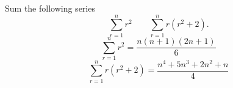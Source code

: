 Sum the following series
\[
\sum^n_{r=1} r^2 \quad \quad \sum^n_{r=1} r(r^2+2).
\]
\newline
\[
\sum^n_{r=1} r^2 = \frac{n(n+1)(2n+1)}{6}
\]
\[
\sum^n_{r=1} r(r^2 +2) = \frac{n^4 + 5n^3 + 2n^2 + n}{4}
\]